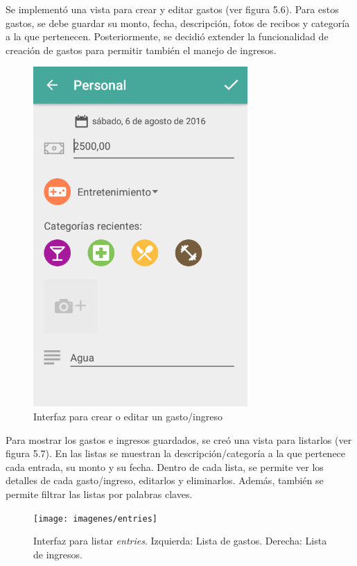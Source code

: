 Se implementó una vista para crear y editar gastos (ver figura 5.6). Para estos gastos, se debe guardar su monto, fecha, descripción, fotos de recibos y categoría a la que pertenecen. Posteriormente, se decidió extender la funcionalidad de creación de gastos para permitir también el manejo de ingresos. 

\begin{figure}[ht]
  \centering
  \includegraphics[scale=0.45,type=png,ext=.png,read=.png]{imagenes/create_entry}
  \caption{Interfaz para crear o editar un gasto/ingreso}
  \label{fig:interfazCrearEntry}
\end{figure}

Para mostrar los gastos e ingresos guardados, se creó una vista para listarlos (ver figura 5.7). En las listas se muestran la descripción/categoría a la que pertenece cada entrada, su monto y su fecha. Dentro de cada lista, se permite ver los detalles de cada gasto/ingreso, editarlos y eliminarlos. Además, también se permite filtrar las listas por palabras claves.

\begin{figure}[ht]
  \centering
  \texttt{[image: imagenes/entries]}
 \caption{Interfaz para listar \textit{entries}. Izquierda: Lista de gastos. Derecha: Lista de ingresos.}
  \label{fig:interfazListarGastos}
\end{figure}

